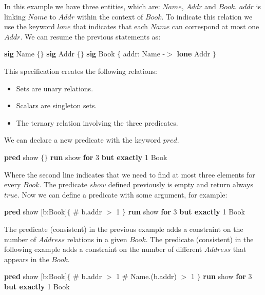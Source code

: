 \documentclass[12pt, a4paper]{report}
\newtheorem[style=M,bodystyle=\normalfont]{theorem}{Theorem}
\newtheorem[style=M,bodystyle=\normalfont]{corollary}{Corollary}
\newtheorem[style=M,bodystyle=\normalfont]{lemma}{Lemma}
\newtheorem[style=M,bodystyle=\normalfont]{definition}{Definition}
\begin{document}
        In this example we have three entities, which are: $Name$, $Addr$ and $Book$.
        $addr$ is linking $Name$ to $Addr$ within the context of $Book$. To indicate this relation we use the keyword $lone$ that indicates that each $Name$ can correspond at most one 
        $Addr$. We can resume the previous statements as:
        \begin{algorithmic}[H]
            \State \textbf{sig} Name $\{\}$
            \State \textbf{sig} Addr $\{\}$
            \State \textbf{sig} Book $\{$ 
            \State \:\:\:\:\:\: addr: Name -$>$ \textbf{lone} Addr 
            \State $\}$
        \end{algorithmic}
        This specification creates the following relations: 
        \begin{itemize}
            \item Sets are unary relations.
            \item Scalars are singleton sets.
            \item The ternary relation involving the three predicates.
        \end{itemize}
        We can declare a new predicate with the keyword $pred$. 
        \begin{algorithmic}[H]
            \State \textbf{pred} show $\{\}$
            \State \textbf{run} show \textbf{for} 3 \textbf{but exactly} 1 Book
        \end{algorithmic}
        Where the second line indicates that we need to find at most three elements for every $Book$. The predicate $show$ defined previously is empty and return always $true$. Now we 
        can define a predicate with some argument, for example: 
        \newpage
        \begin{algorithmic}[h]
            \State \textbf{pred} show [b:Book]$\{$
            \State \:\:\:\:\:\: $\#$ b.addr $>$ 1
            \State $\}$
            \State \textbf{run} show \textbf{for} 3 \textbf{but exactly} 1 Book
        \end{algorithmic} 
        The predicate (consistent) in the previous example adds a constraint on the number of $Address$ relations in a given $Book$. 
        The predicate (consistent) in the following example adds a constraint on the number of different $Address$ that appears in the $Book$.
        \begin{algorithmic}[H]
            \State \textbf{pred} show [b:Book]$\{$
            \State \:\:\:\:\:\: $\#$ b.addr $>$ 1
            \State \:\:\:\:\:\: $\#$ Name.(b.addr) $>$ 1
            \State $\}$
            \State \textbf{run} show \textbf{for} 3 \textbf{but exactly} 1 Book
        \end{algorithmic}
\end{document}
